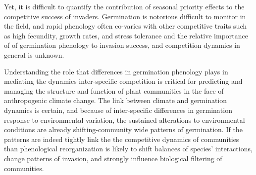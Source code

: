 \documentclass{article}\usepackage[]{graphicx}\usepackage[]{color}
\begin{document}
Yet, it is difficult to quantify the contribution of seasonal priority effects to the competitive success of invaders. Germination is notorious difficult to monitor in the field, and rapid phenology often co-varies with other competitive traits such as high fecundity, growth rates, and stress tolerance \citep{} and the relative importance of of germination phenology to invasion success, and competition dynamics in general is unknown.

Understanding the role that differences in germination phenology plays in mediating the dynamics
inter-specific competition is critical for predicting and managing the structure and function of plant communities in the face of anthropogenic climate change. The link between climate and germination dynamics is certain, and because of inter-specific differences in germination response to environmental variation, the sustained alterations to environmental conditions are already shifting-community wide patterns of germination. If the patterns are indeed tightly link the the competitive dynamics of communities than phenological reorganization is likely to shift balances of species' interactions, change patterns of invasion, and strongly influence biological filtering of communities. 
\end{document}
